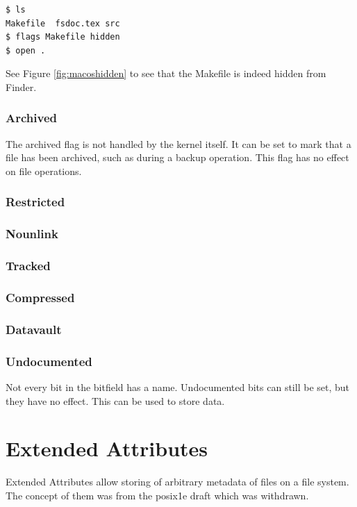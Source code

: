 \documentclass[a4paper]{article}
\begin{document}
\begin{verbatim}
$ ls
Makefile  fsdoc.tex src
$ flags Makefile hidden
$ open .
\end{verbatim}
See Figure \ref{fig:macoshidden} to see that the Makefile is indeed hidden from Finder.

\subsubsection{Archived}

The archived flag is not handled by the kernel itself. It can be set to mark that a file has been archived, such as during a backup operation. This flag has no effect on file operations.

\subsubsection{Restricted}

\subsubsection{Nounlink}

\subsubsection{Tracked}

\subsubsection{Compressed}

\subsubsection{Datavault}

\subsubsection{Undocumented}

Not every bit in the bitfield has a name. Undocumented bits can still be set, but they have no effect. This can be used to store data.

\section{Extended Attributes}

Extended Attributes allow storing of arbitrary metadata of files on a file system. The concept of them was from the \gls{posix}\.1e draft which was withdrawn.
\end{document}
